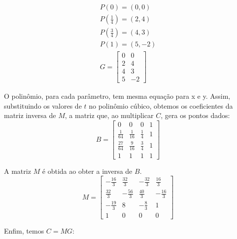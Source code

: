 \documentclass[12pt]{article}
\begin{document}
\begin{gather*}
    P\left( 0 \right) = (0,0) \\
    P\left(\frac{1}{4}\right) = (2,4) \\
    P\left(\frac{3}{4}\right) = (4,3) \\
    P\left(1\right) = (5,-2) \\
    G =
    \begin{bmatrix}
    0 & 0 \\
    2 & 4 \\
    4 & 3 \\
    5 & -2
    \end{bmatrix}
\end{gather*}

O polinômio, para cada parâmetro, tem mesma equação para x e y. Assim, substituindo os valores de $t$ no polinômio cúbico, obtemos os coeficientes da matriz inversa de $M$, a matriz que, ao multiplicar $C$, gera os pontos dados:
\begin{equation*}
    \renewcommand\arraystretch{2}
    B =
    \begin{bmatrix}
    0 & 0 & 0 & 1 \\
    \frac{1}{64} & \frac{1}{16} & \frac{1}{4} & 1\\
    \frac{27}{64} & \frac{9}{16} & \frac{3}{4} & 1\\
    1 & 1 & 1 & 1
    \end{bmatrix}
\end{equation*}{}

A matriz $M$ é obtida ao obter a inversa de $B$.
\begin{equation*}
    \renewcommand\arraystretch{2}
    M=
    \begin{bmatrix}
    -\frac{16}{3} & \frac{32}{3} & -\frac{32}{3} & \frac{16}{3}\\ 
    \frac{32}{3} & -\frac{56}{3} & \frac{40}{3} & -\frac{16}{3}\\
    -\frac{19}{3} & 8 &-\frac{8}{3} & 1\\
    1 & 0 & 0 & 0
    \end{bmatrix}
\end{equation*}

Enfim, temos $C=MG$:
\end{document}
